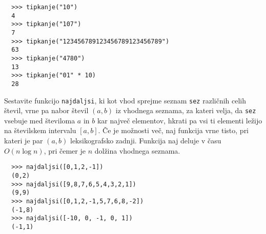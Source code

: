 \documentclass[arhiv]{../izpit}
\begin{document}
  \begin{verbatim}
  >>> tipkanje("10")
  4
  >>> tipkanje("107")
  7
  >>> tipkanje("123456789123456789123456789")
  63
  >>> tipkanje("4780")
  13
  >>> tipkanje("01" * 10)
  28
  \end{verbatim}



  Sestavite funkcijo \texttt{najdaljsi}, ki kot vhod sprejme seznam \texttt{sez}
  različnih celih števil, vrne pa nabor števil $(a,b)$ iz vhodnega seznama, za
  kateri velja, da \texttt{sez} vsebuje med številoma $a$ in $b$ kar največ
  elementov, hkrati pa vsi ti elementi ležijo na številskem intervalu $[a,b]$.
  Če je možnosti več, naj funkcija vrne tisto, pri kateri je par $(a,b)$
  leksikografsko zadnji. Funkcija naj deluje v času $O(n \log n)$, pri čemer je
  $n$ dolžina vhodnega seznama.

  \begin{verbatim}
  >>> najdaljsi([0,1,2,-1])
  (0,2)
  >>> najdaljsi([9,8,7,6,5,4,3,2,1])
  (9,9)
  >>> najdaljsi([0,1,2,-1,5,7,6,8,-2])
  (-1,8)
  >>> najdaljsi([-10, 0, -1, 0, 1])
  (-1,1)
  \end{verbatim}  
\end{document}
